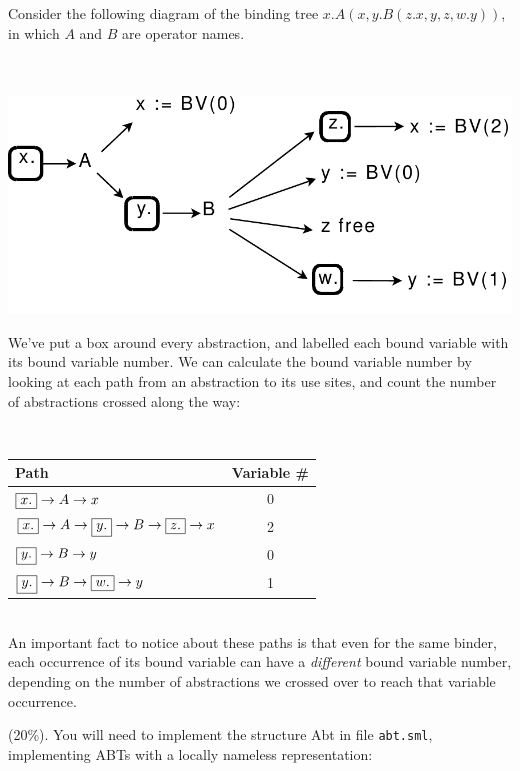 \documentclass[11pt]{article}
\newcounter{taskcounter}
\newcounter{taskPercentCounter}
\newcommand{\task}[1]
  {\bigskip \noindent {\bf Task\addtocounter{taskPercentCounter}{#1} \arabic{taskcounter}\addtocounter{taskcounter}{1}} (#1\%).}
\begin{document}
Consider the following diagram of the binding tree $x. A(x, y.
B(z.x, y, z, w. y))$, in which $A$ and $B$ are operator names.

\ \\
\ \\

\includegraphics{Diagram1.pdf}

We've put a box around every abstraction, and labelled each bound variable
with its bound variable number. We can calculate the bound variable number
by looking at each path from an abstraction to its use sites, and count
the number of abstractions crossed along the way:

\newcommand{\boxabs}[1]{\mbox{\fbox{${#1}.$}}}
\ \\

\begin{tabular}{l|c}
 Path & Variable \# \\ \hline

$\boxabs{x} \to A \to x$ & 0 \\
$\boxabs{x} \to A \to \boxabs{y} \to B \to \boxabs{z} \to x$ & 2 \\
$\boxabs{y} \to B \to y$ & 0 \\
$\boxabs{y} \to B \to \boxabs{w} \to y$ & 1 \\
\end{tabular}

\ \\

An important fact to notice about these paths is that even for the
same binder, each occurrence of its bound variable can have a \emph{different}
bound variable number, depending on the number of abstractions we
crossed over to reach that variable occurrence.

\task{20} You will need to implement the structure Abt in file \texttt{abt.sml},
implementing ABTs with a locally nameless representation:


\end{document}
